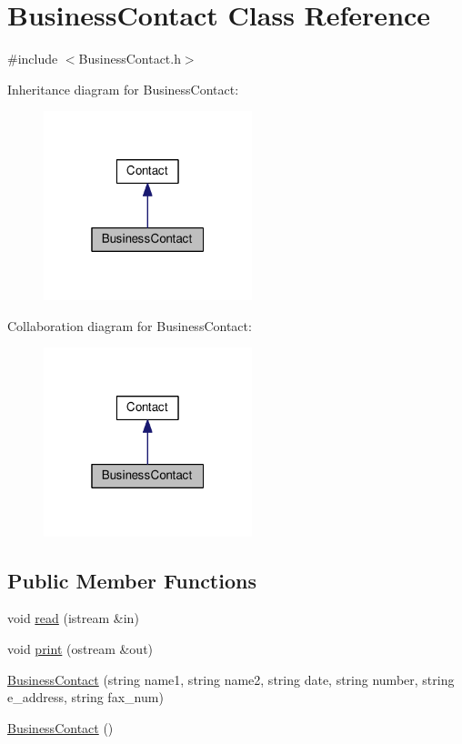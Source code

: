 \hypertarget{classBusinessContact}{}\section{Business\+Contact Class Reference}
\label{classBusinessContact}


{\ttfamily \#include $<$Business\+Contact.\+h$>$}



Inheritance diagram for Business\+Contact\+:
\nopagebreak
\begin{figure}[H]
\begin{center}
\leavevmode
\includegraphics[width=172pt]{classBusinessContact__inherit__graph}
\end{center}
\end{figure}


Collaboration diagram for Business\+Contact\+:
\nopagebreak
\begin{figure}[H]
\begin{center}
\leavevmode
\includegraphics[width=172pt]{classBusinessContact__coll__graph}
\end{center}
\end{figure}
\subsection*{Public Member Functions}
\begin{DoxyCompactItemize}
\item 
void \hyperlink{classBusinessContact_abd412623d1dea64c01ec28a42067dbbc}{read} (istream \&in)
\item 
void \hyperlink{classBusinessContact_a41dd4002894b06e73edc7cc3b1cca3df}{print} (ostream \&out)
\item 
\hyperlink{classBusinessContact_a0840c4eac0339b78d18e76932100a2aa}{Business\+Contact} (string name1, string name2, string date, string number, string e\+\_\+address, string fax\+\_\+num)
\item 
\hyperlink{classBusinessContact_a6d35f0c1907088e8d7e569fcc86cddf2}{Business\+Contact} ()
\end{DoxyCompactItemize}
